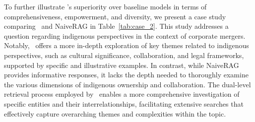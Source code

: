 To further illustrate \model's superiority over baseline models in terms of comprehensiveness, empowerment, and diversity, we present a case study comparing \model\ and NaiveRAG in Table~\ref{tab:case_2}. This study addresses a question regarding indigenous perspectives in the context of corporate mergers. Notably, \model\ offers a more in-depth exploration of key themes related to indigenous perspectives, such as cultural significance, collaboration, and legal frameworks, supported by specific and illustrative examples. In contrast, while NaiveRAG provides informative responses, it lacks the depth needed to thoroughly examine the various dimensions of indigenous ownership and collaboration. The dual-level retrieval process employed by \model\ enables a more comprehensive investigation of specific entities and their interrelationships, facilitating extensive searches that effectively capture overarching themes and complexities within the topic.